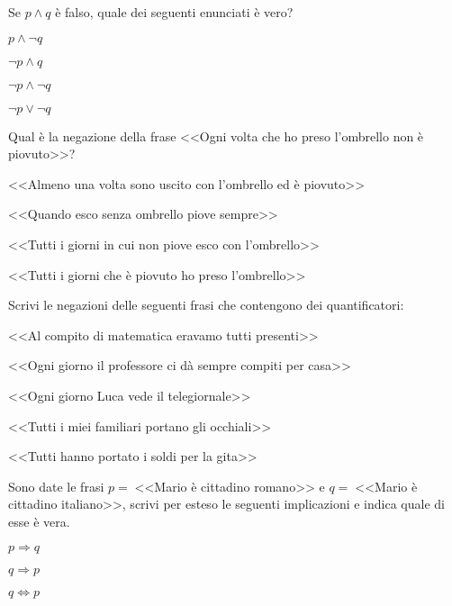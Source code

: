 \begin{esercizio}
\label{ese:1.11}
Se $p\wedge q$ è falso, quale dei seguenti enunciati è vero?
\begin{multicols}{4}
\begin{enumeratea}
\item $p\wedge \neg q$
\item $\neg p\wedge q$
\item $\neg p\wedge\neg q$
\item $\neg p\vee\neg q$
\end{enumeratea}
\end{multicols}
\end{esercizio}

\begin{esercizio}
\label{ese:1.12}
Qual è la negazione della frase <<Ogni volta che ho preso l'ombrello non è piovuto>>?
\begin{enumeratea}
\item <<Almeno una volta sono uscito con l'ombrello ed è piovuto>>
\item <<Quando esco senza ombrello piove sempre>>
\item <<Tutti i giorni in cui non piove esco con l'ombrello>>
\item <<Tutti i giorni che è piovuto ho preso l'ombrello>>
\end{enumeratea}
\end{esercizio}

\begin{esercizio}
\label{ese:1.13}
Scrivi le negazioni delle seguenti frasi che contengono dei quantificatori:
\begin{enumeratea}
\item <<Al compito di matematica eravamo tutti presenti>>
\item <<Ogni giorno il professore ci dà sempre compiti per casa>>
\item <<Ogni giorno Luca vede il telegiornale>>
\item <<Tutti i miei familiari portano gli occhiali>>
\item <<Tutti hanno portato i soldi per la gita>>
\end{enumeratea}
\end{esercizio}

\pagebreak

\begin{esercizio}
\label{ese:1.14}
Sono date le frasi $p=\;$<<Mario è cittadino romano>> e $q=\;$<<Mario è cittadino italiano>>, scrivi per esteso le seguenti implicazioni e indica quale di esse è vera.
\begin{multicols}{3}
\begin{enumeratea}
\item $p\Rightarrow q$		\tab\quad\boxV\quad\boxF
\item $q\Rightarrow p$		\tab\quad\boxV\quad\boxF
\item $q\Leftrightarrow p$	\tab\quad\boxV\quad\boxF
\end{enumeratea}
\end{multicols}
\end{esercizio}


